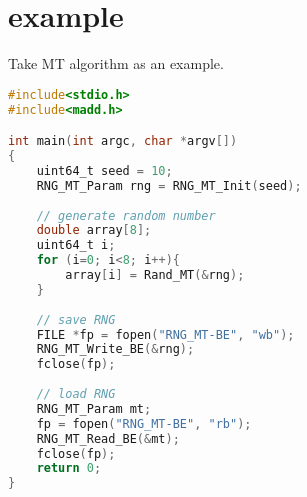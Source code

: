 \section{example}

Take MT algorithm as an example.

\begin{lstlisting}[language=C, title={Example of RNG MT.},]
#include<stdio.h>
#include<madd.h>

int main(int argc, char *argv[])
{
    uint64_t seed = 10;
    RNG_MT_Param rng = RNG_MT_Init(seed);
    
    // generate random number
    double array[8];
    uint64_t i;
    for (i=0; i<8; i++){
        array[i] = Rand_MT(&rng);
    }
    
    // save RNG
    FILE *fp = fopen("RNG_MT-BE", "wb");
    RNG_MT_Write_BE(&rng);
    fclose(fp);
    
    // load RNG
    RNG_MT_Param mt;
    fp = fopen("RNG_MT-BE", "rb");
    RNG_MT_Read_BE(&mt);
    fclose(fp);
    return 0;
}
\end{lstlisting} 